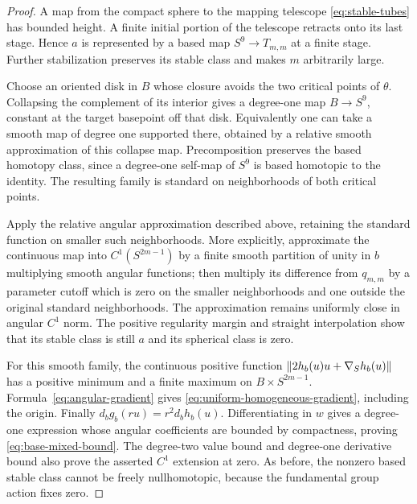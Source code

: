 \begin{proof}
A map from the compact sphere to the mapping telescope
\eqref{eq:stable-tubes} has bounded height. A finite initial portion of
the telescope retracts onto its last stage. Hence $a$ is represented by
a based map $S^9\to T_{m,m}$ at a finite stage. Further stabilization
preserves its stable class and makes $m$ arbitrarily large.

Choose an oriented disk in $B$ whose closure avoids the two critical
points of $\theta$. Collapsing the complement of its interior gives a
degree-one map $B\to S^9$, constant at the target basepoint off that
disk. Equivalently one can take a smooth map of degree one supported
there, obtained by a relative smooth approximation of this collapse
map. Precomposition preserves the based homotopy class, since a
degree-one self-map of $S^9$ is based homotopic to the identity. The
resulting family is standard on neighborhoods of both critical points.

Apply the relative angular approximation described above, retaining the
standard function on smaller such neighborhoods. More explicitly,
approximate the continuous map into $C^1(S^{2m-1})$ by a finite smooth
partition of unity in $b$ multiplying smooth angular functions; then
multiply its difference from $q_{m,m}$ by a parameter cutoff which is
zero on the smaller neighborhoods and one outside the original
standard neighborhoods. The approximation remains uniformly close in
angular $C^1$ norm. The positive regularity margin and straight
interpolation show that its stable class is still $a$ and its spherical
class is zero.

For this smooth family, the continuous positive function
$\lVert2h_b(u)u+\nabla_Sh_b(u)\rVert$ has a positive minimum and a finite
maximum on $B\times S^{2m-1}$. Formula~\eqref{eq:angular-gradient}
gives \eqref{eq:uniform-homogeneous-gradient}, including the origin.
Finally $d_bg_b(ru)=r^2d_bh_b(u)$. Differentiating in $w$ gives a
degree-one expression whose angular coefficients are bounded by
compactness, proving \eqref{eq:base-mixed-bound}. The degree-two value
bound and degree-one derivative bound also prove the asserted $C^1$
extension at zero. As before, the nonzero based stable class cannot
be freely nullhomotopic, because the fundamental group action fixes
zero.
\end{proof}
